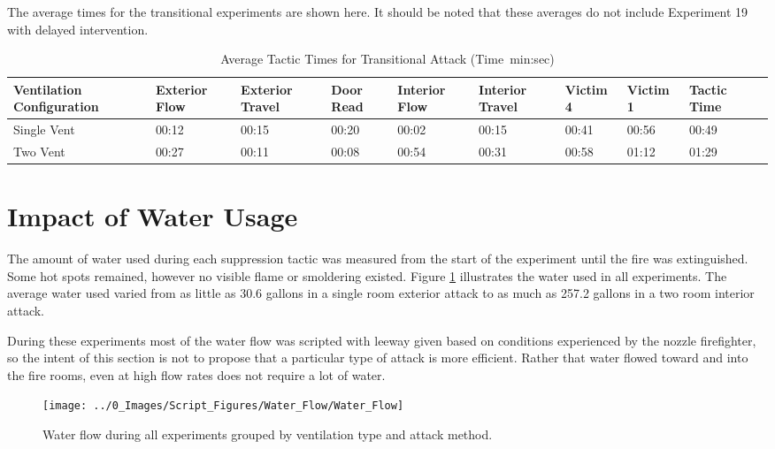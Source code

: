 \documentclass[12pt,oneside]{book}
\begin{document}
The average times for the transitional experiments are shown here. It should be noted that these averages do not include Experiment 19 with delayed intervention.

\begin{table} [H]
\centering
\caption{Average Tactic Times for Transitional Attack (Time~min:sec)}
\begin{tabular}{|C{0.145\textwidth}|C{0.085\textwidth}|C{0.085\textwidth}|C{0.07\textwidth}|C{0.08\textwidth}|C{0.08\textwidth}|C{0.07\textwidth}|C{0.07\textwidth}|C{0.07\textwidth}|C{0.07\textwidth}|}
\hline

Ventilation Configuration & Exterior Flow & Exterior Travel & Door Read & Interior Flow & Interior Travel & Victim 4 & Victim 1 & Tactic Time \\ \hline \hline

Single Vent & 00:12	& 00:15	& 00:20	& 00:02	& 00:15	& 00:41	& 00:56	& 00:49	\\ \hline  
Two Vent 	& 00:27	& 00:11	& 00:08	& 00:54	& 00:31	& 00:58	& 01:12	& 01:29 \\ \hline 
\end{tabular}
\label{tab:transitional_averages}
\end{table}

\section{Impact of Water Usage}
The amount of water used during each suppression tactic was measured from the start of the experiment until the fire was extinguished. Some hot spots remained, however no visible flame or smoldering existed. Figure \ref{fig:water_flow_all} illustrates the water used in all experiments. The average water used varied from as little as 30.6 gallons in a single room exterior attack to as much as 257.2 gallons in a two room interior attack.

During these experiments most of the water flow was scripted with leeway given based on conditions experienced by the nozzle firefighter, so the intent of this section is not to propose that a particular type of attack is more efficient.  Rather that water flowed toward and into the fire rooms, even at high flow rates does not require a lot of water.

\begin{figure}[H]
\centering
\texttt{[image: ../0\_Images/Script\_Figures/Water\_Flow/Water\_Flow]}
\caption[Water Flow All Experiments]{Water flow during all experiments grouped by ventilation type and attack method.}
\label{fig:water_flow_all}
\end{figure}
\end{document}
